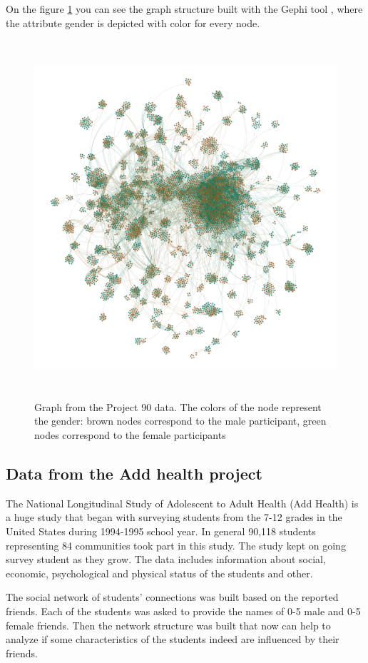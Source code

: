 \documentclass[12pt]{report}
\begin{document}
On the figure \ref{fig:project90gender} you can see the graph structure built with the Gephi tool \cite{GEPHI}, where the attribute gender is depicted with color for every node.
\begin{figure}[ht]
    \centering
    \includegraphics[height=500px]{project90gender}
    \caption{Graph from the Project 90 data. The colors of the node represent the gender: brown nodes correspond to the male participant, green nodes correspond to the female participants}
    \label{fig:project90gender}
\end{figure}

\subsection{Data from the Add health project}

The National Longitudinal Study of Adolescent to Adult Health (Add Health) is a huge study that began with surveying students from the 7-12 grades in the United States during 1994-1995 school year. In general 90,118 students representing 84 communities took part in this study. The study kept on going survey student as they grow. The 
data includes information about social, economic, psychological and physical status of the students and other. 

The social network of students' connections was built based on the reported friends. Each of the students was asked to provide the names of 0-5 male and 0-5 female friends. Then the network structure was built that now can help to analyze if some characteristics of the students indeed are influenced by their friends.
\end{document}
